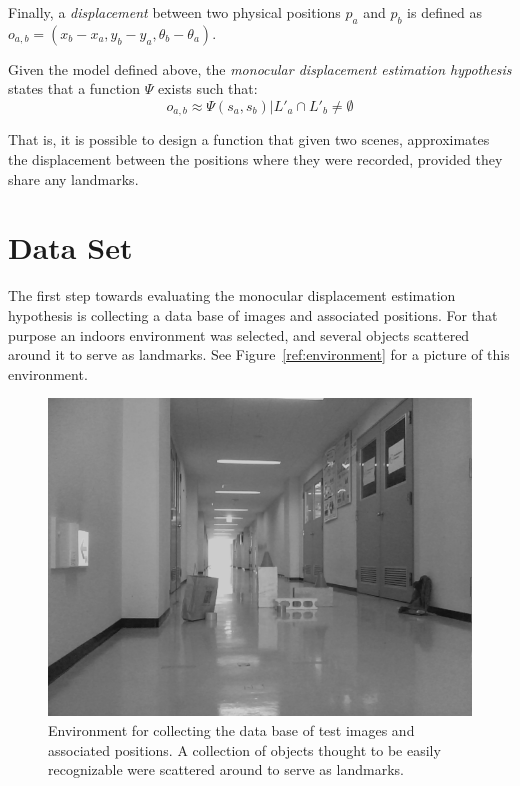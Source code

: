 \documentclass[twocolumn, 9pt]{jsproceedings}
\begin{document}
Finally, a {\it displacement} between two physical positions \(p_a\) and \(p_b\) is defined as \(o_{a,b} = (x_b - x_a, y_b - y_a, \theta_b - \theta_a)\).

Given the model defined above, the {\it monocular displacement estimation hypothesis} states that a function \(\Psi\) exists such that:
\begin{equation}
o_{a,b} \approx \Psi(s_a, s_b) | L'_a \cap L'_b \neq \emptyset
\end{equation}

That is, it is possible to design a function that given two scenes, approximates the displacement between the positions where they were recorded, provided they share any landmarks.

\section{Data Set}

The first step towards evaluating the monocular displacement estimation hypothesis is collecting a data base of images and associated positions. For that purpose an indoors environment was selected, and several objects scattered around it to serve as landmarks. See Figure~\ref{ref:environment} for a picture of this environment.

\begin{figure}[h!]
\includegraphics[width=\columnwidth]{environment.png}
\caption{Environment for collecting the data base of test images and associated positions. A collection of objects thought to be easily recognizable were scattered around to serve as landmarks.}
\label{fig:environment}
\end{figure}
\end{document}
